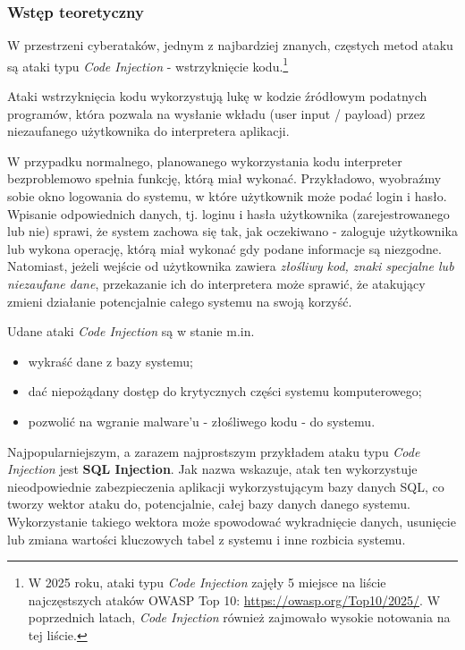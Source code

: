 \documentclass[12pt,a4paper]{article}
\begin{document}
\subsubsection{Wstęp teoretyczny}
W przestrzeni cyberataków, jednym z najbardziej znanych, częstych metod ataku są ataki typu \emph{Code Injection} - wstrzyknięcie kodu.\footnote{
W 2025 roku, ataki typu \emph{Code Injection} zajęły 5 miejsce na liście najczęstszych ataków OWASP Top 10: \url{https://owasp.org/Top10/2025/}.
 W poprzednich latach, \emph{Code Injection} również zajmowało wysokie notowania na tej liście.} 

Ataki wstrzyknięcia kodu wykorzystują lukę w kodzie źródłowym podatnych programów, która pozwala na wysłanie wkładu (user input / payload)  
przez niezaufanego użytkownika do interpretera aplikacji.  

W przypadku normalnego, planowanego wykorzystania kodu interpreter bezproblemowo spełnia funkcję, którą miał wykonać.
Przykładowo, wyobraźmy sobie okno logowania do systemu, w które użytkownik może podać login i hasło. Wpisanie odpowiednich danych,
tj. loginu i hasła użytkownika (zarejestrowanego lub nie) sprawi, że system zachowa się tak, jak oczekiwano - zaloguje użytkownika lub
wykona operację, którą miał wykonać gdy podane informacje są niezgodne.
Natomiast, jeżeli wejście od użytkownika zawiera \emph{złośliwy kod, znaki specjalne lub niezaufane dane}, przekazanie ich 
do interpretera może sprawić, że atakujący zmieni działanie potencjalnie całego systemu na swoją korzyść.

Udane ataki \emph{Code Injection} są w stanie m.in. 
\begin{itemize}
    \item wykraść dane z bazy systemu;
    \item dać niepożądany dostęp do krytycznych części systemu komputerowego;
    \item pozwolić na wgranie malware'u - złośliwego kodu - do systemu. 
\end{itemize} 

Najpopularniejszym, a zarazem najprostszym przykładem ataku typu \emph{Code Injection} jest \textbf{SQL Injection}.
Jak nazwa wskazuje, atak ten wykorzystuje nieodpowiednie zabezpieczenia aplikacji wykorzystującym bazy danych SQL, 
co tworzy wektor ataku do, potencjalnie, całej bazy danych danego systemu. Wykorzystanie takiego wektora może spowodować
wykradnięcie danych, usunięcie lub zmiana wartości kluczowych tabel z systemu i inne rozbicia systemu.
\end{document}
